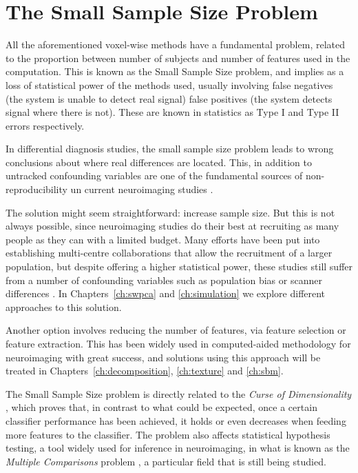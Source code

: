 \section{The Small Sample Size Problem}\label{sec:smallsamplesize}
All the aforementioned voxel-wise methods have a fundamental problem, related to the proportion between number of subjects and number of features used in the computation. This is known as the Small Sample Size problem, and implies as a loss of statistical power of the methods used, usually involving false negatives (the system is unable to detect real signal) false positives (the system detects signal where there is not). These are known in statistics as Type I and Type II errors respectively. 

In differential diagnosis studies, the small sample size problem leads to wrong conclusions about where real differences are located. This, in addition to untracked confounding variables are one of the fundamental sources of non-reproducibility un current neuroimaging studies \cite{Button2013}. 

The solution might seem straightforward: increase sample size. But this is not always possible, since neuroimaging studies do their best at recruiting as many people as they can with a limited budget. Many efforts have been put into establishing multi-centre collaborations that allow the recruitment of a larger population, but despite offering a higher statistical power, these studies still suffer from a number of confounding variables such as population bias or scanner differences \cite{haar2014anatomical}. In Chapters~\ref{ch:swpca} and \ref{ch:simulation} we explore different approaches to this solution. 

Another option involves reducing the number of features, via feature selection or feature extraction. This has been widely used in computed-aided methodology for neuroimaging \cite{DeMartino2007,xu2009source,Gorriz2010,Illan2011,Martinez-Murcia2016} with great success, and solutions using this approach will be treated in Chapters~\ref{ch:decomposition}, \ref{ch:texture} and \ref{ch:sbm}. 

The Small Sample Size problem is directly related to the \textit{Curse of Dimensionality} \cite{Krishnaiah1982}, which proves that, in contrast to what could be expected, once a certain classifier performance has been achieved, it holds or even decreases when feeding more features to the classifier. The problem also affects statistical hypothesis testing, a tool widely used for inference in neuroimaging, in what is known as the \textit{Multiple Comparisons} problem \cite{Benjamini2010}, a particular field that is still being studied. 


